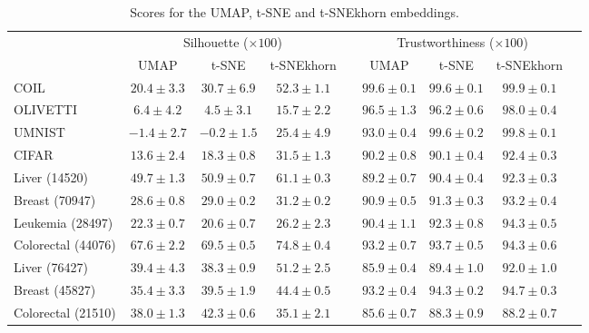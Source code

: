 \begin{table}\centering
\caption{Scores for the UMAP, t-SNE and t-SNEkhorn embeddings.}
\vskip 0.1in
\begin{footnotesize}
\begin{tabular}{@{\hskip 0.1in}l@{\hskip 0.1in}c@{\hskip 0.1in}c@{\hskip 0.1in}c@{\hskip 0.1in}c@{\hskip 0.1in}c@{\hskip 0.1in}c@{\hskip 0.1in}c@{\hskip 0.1in}c@{\hskip 0.1in}}
    \toprule[1.5pt]
& \multicolumn{3}{c}{Silhouette ($\times 100$)} & & \multicolumn{3}{c}{Trustworthiness ($\times 100$)} \\
\cmidrule{2-4} \cmidrule{6-8}
& UMAP & t-SNE & t-SNEkhorn && UMAP & t-SNE & t-SNEkhorn \\ \midrule
COIL & $20.4\pm3.3$ & $30.7\pm6.9$ & $\mathbf{52.3\pm1.1}$ && $99.6\pm0.1$ & $99.6\pm0.1$ & $\mathbf{99.9\pm0.1}$ \\ 
OLIVETTI & $6.4\pm4.2$ & $4.5\pm3.1$ & $\mathbf{15.7\pm2.2}$ && $96.5\pm1.3$ & $96.2\pm0.6$ & $\mathbf{98.0\pm0.4}$ \\
UMNIST & $-1.4\pm2.7$ & $-0.2\pm1.5$ & $\mathbf{25.4\pm4.9}$ && $93.0\pm0.4$ & $99.6\pm0.2$ & $\mathbf{99.8\pm0.1}$ \\
CIFAR & $13.6\pm2.4$ & $18.3\pm0.8$ & $\mathbf{31.5\pm1.3}$ && $90.2\pm0.8$ & $90.1\pm0.4$ & $\mathbf{92.4\pm0.3}$ \\ \midrule[0.2pt]
Liver \tiny{(14520)} & $49.7\pm1.3$ & $50.9\pm0.7$ & $\mathbf{61.1\pm0.3}$ && $89.2\pm0.7$ & $90.4\pm0.4$ & $\mathbf{92.3\pm0.3}$ \\
Breast \tiny{(70947)} & $28.6\pm0.8$ & $29.0\pm0.2$ & $\mathbf{31.2\pm0.2}$ && $90.9\pm0.5$ & $91.3\pm0.3$ & $\mathbf{93.2\pm0.4}$ \\
Leukemia \tiny{(28497)} & $22.3\pm0.7$ & $20.6\pm0.7$ & $\mathbf{26.2\pm2.3}$ && $90.4\pm1.1$ & $92.3\pm0.8$ & $\mathbf{94.3\pm0.5}$ \\
Colorectal \tiny{(44076)} & $67.6\pm2.2$ & $69.5\pm0.5$ & $\mathbf{74.8\pm0.4}$ && $93.2\pm0.7$ & $93.7\pm0.5$ & $\mathbf{94.3\pm0.6}$ \\
Liver \tiny{(76427)} & $39.4\pm4.3$ & $38.3\pm0.9$ & $\mathbf{51.2\pm2.5}$ && $85.9\pm0.4$ & $89.4\pm1.0$ & $\mathbf{92.0\pm1.0}$ \\
Breast \tiny{(45827)} & $35.4\pm3.3$ & $39.5\pm1.9$ & $\mathbf{44.4\pm0.5}$ && $93.2\pm0.4$ & $94.3\pm0.2$ & $\mathbf{94.7\pm0.3}$ \\
Colorectal \tiny{(21510)} & $38.0\pm1.3$ & $\mathbf{42.3\pm0.6}$ & $35.1\pm2.1$ && $85.6\pm0.7$ & $\mathbf{88.3\pm0.9}$ & $88.2\pm0.7$ \\

\end{tabular}
\end{footnotesize}
\end{table}

